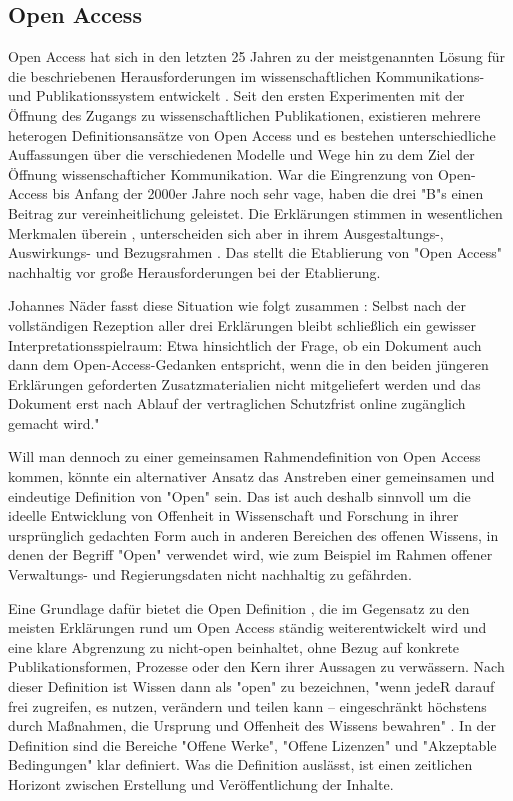 \subsection{Open Access}

Open Access hat sich in den letzten 25 Jahren zu der meistgenannten Lösung für die beschriebenen Herausforderungen im wissenschaftlichen Kommunikations- und Publikationssystem entwickelt \cite{brembs2015open}. Seit den ersten Experimenten mit der Öffnung des Zugangs zu wissenschaftlichen Publikationen, existieren mehrere heterogen Definitionsansätze von Open Access und es bestehen unterschiedliche Auffassungen über die verschiedenen Modelle und Wege hin zu dem Ziel der Öffnung wissenschafticher Kommunikation. War die Eingrenzung von Open-Access bis Anfang der 2000er Jahre noch sehr vage, haben die drei "B"s einen Beitrag zur vereinheitlichung geleistet. Die Erklärungen stimmen in wesentlichen Merkmalen überein \cite{albert_2006_open_implications}, unterscheiden sich aber in ihrem Ausgestaltungs-, Auswirkungs- und Bezugsrahmen \cite{naeder_2010_open}. Das stellt die Etablierung von "Open Access" nachhaltig vor große Herausforderungen bei der Etablierung.

Johannes Näder fasst diese Situation wie folgt zusammen \cite{naeder_2010_open}:
Selbst nach der vollständigen Rezeption aller drei Erklärungen bleibt schließlich ein gewisser Interpretationsspielraum: Etwa hinsichtlich der Frage, ob ein Dokument auch dann dem Open-Access-Gedanken entspricht, wenn die in den beiden jüngeren Erklärungen geforderten Zusatzmaterialien nicht mitgeliefert werden und das Dokument erst nach Ablauf der vertraglichen Schutzfrist online zugänglich gemacht wird."

Will man dennoch zu einer gemeinsamen Rahmendefinition von Open Access kommen, könnte ein alternativer Ansatz das Anstreben einer gemeinsamen und eindeutige Definition von "Open" sein. Das ist auch deshalb sinnvoll um die ideelle Entwicklung von Offenheit in Wissenschaft und Forschung in ihrer ursprünglich gedachten Form auch in anderen Bereichen des offenen Wissens, in denen der Begriff "Open" verwendet wird, wie zum Beispiel im Rahmen offener Verwaltungs- und Regierungsdaten nicht nachhaltig zu gefährden.

Eine Grundlage dafür bietet die Open Definition \cite{open_definition}, die im Gegensatz zu den meisten Erklärungen rund um Open Access ständig weiterentwickelt wird und eine klare Abgrenzung zu nicht-open beinhaltet, ohne Bezug auf konkrete Publikationsformen, Prozesse oder den Kern ihrer Aussagen zu verwässern. Nach dieser Definition ist Wissen dann als "open" zu bezeichnen, "wenn jedeR darauf frei zugreifen, es nutzen, verändern und teilen kann – eingeschränkt höchstens durch Maßnahmen, die Ursprung und Offenheit des Wissens bewahren" \cite{open_definition}. In der Definition sind die Bereiche "Offene Werke", "Offene Lizenzen" und "Akzeptable Bedingungen" klar definiert. Was die Definition auslässt, ist einen zeitlichen Horizont zwischen Erstellung und Veröffentlichung der Inhalte.

